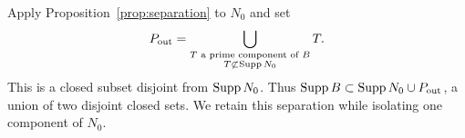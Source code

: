 Apply Proposition~\ref{prop:separation} to $N_0$ and set
\begin{equation}\label{eq:Pout}
P_{\mathrm{out}}=
\bigcup_{\substack{T\text{ a prime component of }B\\T\not\subset\operatorname{Supp} N_0}}T.
\end{equation}
This is a closed subset disjoint from $\operatorname{Supp} N_0$. Thus
$\operatorname{Supp} B\subset\operatorname{Supp} N_0\cup P_{\mathrm{out}}$, a union of two
disjoint closed sets. We retain this separation while isolating one
component of $N_0$.
